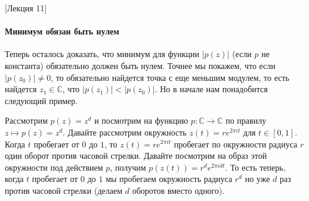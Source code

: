 [Лекция 11]


\paragraph{Минимум обязан быть нулем}

Теперь осталось доказать, что минимум для функции $|p(z)|$ (если $p$ не константа) обязательно должен быть нулем.
Точнее мы покажем, что если $|p(z_0)|\neq 0$, то обязательно найдется точка с еще меньшим модулем, то есть найдется $z_1\in \mathbb C$, что $|p(z_1)|< |p(z_0)|$.
Но в начале нам понадобится следующий пример.

\begin{example}
[V.I.P. пример]
Рассмотрим $p(z) = z^d$ и посмотрим на функцию $p\colon \mathbb C\to \mathbb C$ по правилу $z \mapsto p(z) = z^d$.
Давайте рассмотрим окружность $z(t) = r e^{2\pi i t}$ для $t\in [0, 1]$.
Когда $t$ пробегает от $0$ до $1$, то $z(t) = r e^{2\pi i t}$ пробегает по окружности радиуса $r$ один оборот против часовой стрелки.
Давайте посмотрим на образ этой окружности под действием $p$, получим $p(z(t)) = r^d e^{2\pi i d t}$.
То есть теперь, когда $t$ пробегает от $0$ до $1$ мы пробегаем окружность радиуса $r^d$ но уже $d$ раз против часовой стрелки (делаем $d$ оборотов вместо одного).
\end{example}

